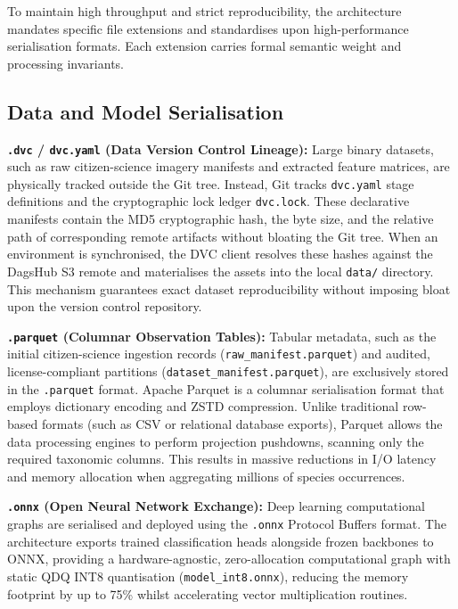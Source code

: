 To maintain high throughput and strict reproducibility, the architecture mandates specific file extensions and standardises upon high-performance serialisation formats. Each extension carries formal semantic weight and processing invariants.

\subsection{Data and Model Serialisation}

\textbf{\texttt{.dvc} / \texttt{dvc.yaml} (Data Version Control Lineage):} Large binary datasets, such as raw citizen-science imagery manifests and extracted feature matrices, are physically tracked outside the Git tree. Instead, Git tracks \texttt{dvc.yaml} stage definitions and the cryptographic lock ledger \texttt{dvc.lock}. These declarative manifests contain the MD5 cryptographic hash, the byte size, and the relative path of corresponding remote artifacts without bloating the Git tree. When an environment is synchronised, the DVC client resolves these hashes against the DagsHub S3 remote and materialises the assets into the local \texttt{data/} directory. This mechanism guarantees exact dataset reproducibility without imposing bloat upon the version control repository.

\textbf{\texttt{.parquet} (Columnar Observation Tables):} Tabular metadata, such as the initial citizen-science ingestion records (\texttt{raw\_manifest.parquet}) and audited, license-compliant partitions (\texttt{dataset\_manifest.parquet}), are exclusively stored in the \texttt{.parquet} format. Apache Parquet is a columnar serialisation format that employs dictionary encoding and ZSTD compression. Unlike traditional row-based formats (such as CSV or relational database exports), Parquet allows the data processing engines to perform projection pushdowns, scanning only the required taxonomic columns. This results in massive reductions in I/O latency and memory allocation when aggregating millions of species occurrences.

\textbf{\texttt{.onnx} (Open Neural Network Exchange):} Deep learning computational graphs are serialised and deployed using the \texttt{.onnx} Protocol Buffers format. The architecture exports trained classification heads alongside frozen backbones to ONNX, providing a hardware-agnostic, zero-allocation computational graph with static QDQ INT8 quantisation (\texttt{model\_int8.onnx}), reducing the memory footprint by up to 75\% whilst accelerating vector multiplication routines.


